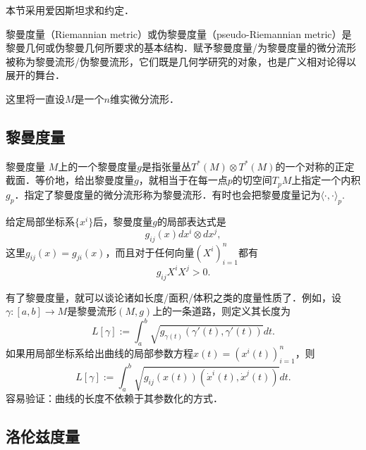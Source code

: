 
本节采用爱因斯坦求和约定．

黎曼度量（Riemannian metric）或伪黎曼度量（pseudo-Riemannian metric）是黎曼几何或伪黎曼几何所要求的基本结构．赋予黎曼度量/为黎曼度量的微分流形被称为黎曼流形/伪黎曼流形，它们既是几何学研究的对象，也是广义相对论得以展开的舞台．

这里将一直设$M$是一个$n$维实微分流形．

\subsection{黎曼度量}
\begin{definition}{黎曼度量}
$M$上的一个黎曼度量$g$是指张量丛$T^*(M)\otimes T^*(M)$的一个对称的正定截面．等价地，给出黎曼度量$g$，就相当于在每一点$p$的切空间$T_pM$上指定一个内积$g_p$．指定了黎曼度量的微分流形称为黎曼流形．有时也会把黎曼度量记为$\langle\cdot,\cdot\rangle_p$.
\end{definition}
给定局部坐标系$\{x^i\}$后，黎曼度量$g$的局部表达式是
$$
g_{ij}(x)dx^i\otimes dx^j,
$$
这里$g_{ij}(x)=g_{ji}(x)$，而且对于任何向量$(X^i)_{i=1}^n$都有
$$
g_{ij}X^iX^j>0.
$$

有了黎曼度量，就可以谈论诸如长度/面积/体积之类的度量性质了．例如，设$\gamma:[a,b]\to M$是黎曼流形$(M,g)$上的一条道路，则定义其长度为
$$
L[\gamma]:=\int_{a}^b \sqrt{g_{\gamma(t)}(\gamma'(t),\gamma'(t))}dt.
$$
如果用局部坐标系给出曲线的局部参数方程$x(t)=(x^i(t))_{i=1}^n$，则
$$
L[\gamma]:=\int_{a}^b \sqrt{g_{ij}(x(t))(\dot x^i(t),\dot x^j(t))}dt.
$$
容易验证：曲线的长度不依赖于其参数化的方式．



\subsection{洛伦兹度量}